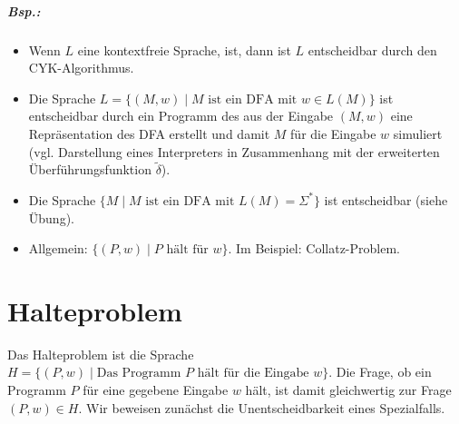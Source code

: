 \documentclass{scrreprt}
\begin{document}
\subparagraph{Bsp.:}
\begin{itemize}
\item Wenn $L$ eine kontextfreie Sprache, ist, dann ist $L$ entscheidbar durch den CYK-Algorithmus.
\item Die Sprache $L= \{ (M,w) \;|\; M \text{ ist ein DFA mit }w\in L(M)\}$ ist entscheidbar durch ein Programm des aus der Eingabe $(M,w)$ eine Repräsentation des DFA erstellt und damit $M$ für die Eingabe $w$ simuliert (vgl. Darstellung eines Interpreters in Zusammenhang mit der erweiterten Überführungsfunktion $\tilde{\delta}$).
\item Die Sprache $\{ M \;|\; M \text{ ist ein DFA mit }L(M)=\Sigma^*\}$ ist entscheidbar (siehe Übung).
\item Allgemein: $\{(P,w)\;|\;P \text{ hält für }w\}$. Im Beispiel: Collatz-Problem.
\end{itemize}
\section{Halteproblem}
Das Halteproblem ist die Sprache $H=\{ (P,w) \;|\; \text{Das Programm $P$ hält für die Eingabe }w\}$. Die Frage, ob ein Programm $P$ für eine gegebene Eingabe $w$ hält, ist damit gleichwertig zur Frage $(P,w)\in H$. Wir beweisen zunächst die Unentscheidbarkeit eines Spezialfalls.
\end{document}
